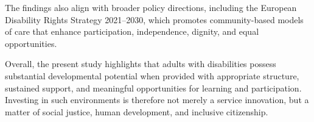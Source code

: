 \documentclass[journal]{IEEEtran}
\begin{document}
The findings also align with broader policy directions, including the European Disability Rights Strategy 2021--2030, which promotes community-based models of care that enhance participation, independence, dignity, and equal opportunities.

Overall, the present study highlights that adults with disabilities possess substantial developmental potential when provided with appropriate structure, sustained support, and meaningful opportunities for learning and participation. Investing in such environments is therefore not merely a service innovation, but a matter of social justice, human development, and inclusive citizenship.



\end{document}
